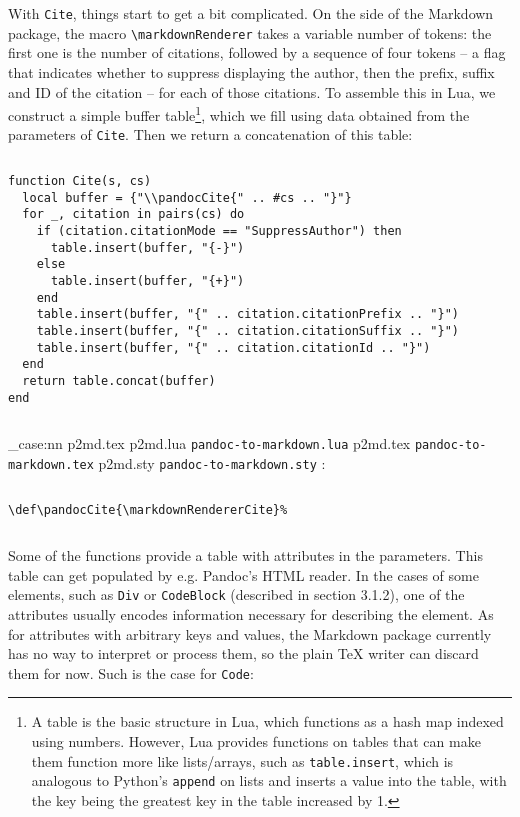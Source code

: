\documentclass[
  digital,     %
  oneside,     %
  nosansbold,  %
  nocolorbold, %
  lof,         %
  lot,         %
]{fithesis4}
\newcommand\macro[1]{\texttt{\textbackslash{}{#1}}}
\newcommand\renderer[1]{\macro{markdown\-Renderer\-{#1}}}
\newcommand\file[1]
  {
    \str_case:nn
      { #1 }
      {
        { p2md.lua } { \texttt{pandoc\hyp{}to\hyp{}markdown.lua} }
        { p2md.tex } { \texttt{pandoc\hyp{}to\hyp{}markdown.tex} }
        { p2md.sty } { \texttt{pandoc\hyp{}to\hyp{}markdown.sty} }
      }
  }
\begin{document}
\noindent
With \texttt{Cite}, things start to get a bit complicated. On the side of the Markdown package, the macro \renderer{Cite} takes a variable number of tokens: the first one is the number of citations, followed by a sequence of four tokens -- a flag that indicates whether to suppress displaying the author, then the prefix, suffix and ID of the citation -- for each of those citations. To assemble this in Lua, we construct a simple buffer table\footnote{A table is the basic structure in Lua, which functions as a hash map indexed using numbers. However, Lua provides functions on tables that can make them function more like lists/arrays, such as \texttt{table.insert}, which is analogous to Python's \texttt{append} on lists and inserts a value into the table, with the key being the greatest key in the table increased by 1.}, which we fill using data obtained from the parameters of \texttt{Cite}. Then we return a concatenation of this table:

$ $

\noindent
\lstset{language=[5.3]Lua}
\begin{lstlisting}
function Cite(s, cs)
  local buffer = {"\\pandocCite{" .. #cs .. "}"}
  for _, citation in pairs(cs) do
    if (citation.citationMode == "SuppressAuthor") then
      table.insert(buffer, "{-}")
    else
      table.insert(buffer, "{+}")
    end
    table.insert(buffer, "{" .. citation.citationPrefix .. "}")
    table.insert(buffer, "{" .. citation.citationSuffix .. "}")
    table.insert(buffer, "{" .. citation.citationId .. "}")
  end
  return table.concat(buffer)
end
\end{lstlisting}

$ $

\noindent
\file{p2md.tex}:

$ $

\noindent
\lstset{language=[plain]TeX}
\begin{lstlisting}
\def\pandocCite{\markdownRendererCite}%
\end{lstlisting}

$ $

\noindent
Some of the functions provide a table with attributes in the parameters. This table can get populated by e.g. Pandoc's HTML reader. In the cases of some elements, such as \texttt{Div} or \texttt{CodeBlock} (described in section 3.1.2), one of the attributes usually encodes information necessary for describing the element. As for attributes with arbitrary keys and values, the Markdown package currently has no way to interpret or process them, so the plain \TeX{} writer can discard them for now. Such is the case for \texttt{Code}:
\end{document}
